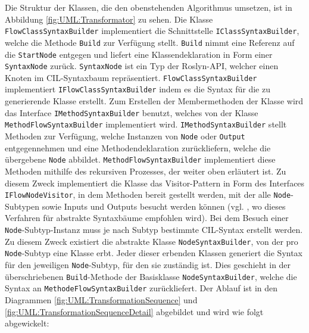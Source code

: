 \newline
Die Struktur der Klassen, die den obenstehenden Algorithmus umsetzen, ist in Abbildung \ref{fig:UML:Transformator} zu sehen. Die Klasse \texttt{FlowClassSyntaxBuilder} implementiert die Schnittstelle \texttt{IClassSyntaxBuilder}, welche die Methode \texttt{Build} zur Verfügung stellt. \texttt{Build} nimmt eine Referenz auf die \texttt{StartNode} entgegen und liefert eine Klassendeklaration in Form einer \texttt{SyntaxNode} zurück. \texttt{SyntaxNode} ist ein Typ der Roslyn-API, welcher einen Knoten im CIL-Syntaxbaum repräsentiert. \texttt{FlowClassSyntaxBuilder} implementiert \texttt{IFlowClassSyntaxBuilder} indem es die Syntax für die zu generierende Klasse erstellt. Zum Erstellen der Membermethoden der Klasse wird das Interface \texttt{IMethodSyntaxBuilder} benutzt, welches von der Klasse \texttt{MethodFlowSyntaxBuilder} implementiert wird. \texttt{IMethodSyntaxBuilder} stellt Methoden zur Verfügung, welche Instanzen von \texttt{Node} oder \texttt{Output} entgegennehmen und eine Methodendeklaration zurückliefern, welche die übergebene \texttt{Node} abbildet. \texttt{MethodFlowSyntaxBuilder} implementiert diese Methoden mithilfe des rekursiven Prozesses, der weiter oben erläutert ist. Zu diesem Zweck implementiert die Klasse das Visitor-Pattern in Form des Interfaces \texttt{IFlowNodeVisitor}, in dem Methoden bereit gestellt werden, mit der alle \texttt{Node}-Subtypen sowie Inputs und Outputs besucht werden können (vgl. \cite[S. 5f]{Jones}, wo dieses Verfahren für abstrakte Syntaxbäume empfohlen wird). Bei dem Besuch einer \texttt{Node}-Subtyp-Instanz muss je nach Subtyp bestimmte CIL-Syntax erstellt werden. Zu diesem Zweck existiert die abstrakte Klasse \texttt{NodeSyntaxBuilder}, von der pro \texttt{Node}-Subtyp eine Klasse erbt. Jeder dieser erbenden Klassen generiert die Syntax für den jeweiligen \texttt{Node}-Subtyp, für den sie zuständig ist. Dies geschieht in der überschriebenen \texttt{Build}-Methode der Basisklasse \texttt{NodeSyntaxBuilder}, welche die Syntax an \texttt{MethodeFlowSyntaxBuilder} zurückliefert. Der Ablauf ist in den Diagrammen \ref{fig:UML:TransformationSequence} und \ref{fig:UML:TransformationSequenceDetail} abgebildet und wird wie folgt abgewickelt:
\newline
